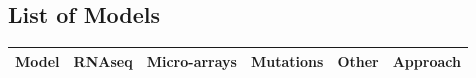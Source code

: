 \newpage

\begin{appendices}
    \section{List of Models} \label{ap:tables_models}
 
    \begin{small}
          \begin{longtable}[!h]{|p{2.0cm}|c|p{1.5cm}|c|p{2.2cm}|p{6.0cm}|} 
              \hline \multicolumn{1}{|c|}{\textbf{Model}} 
              & \multicolumn{1}{p{1.8cm}|}{\textbf{RNAseq}} 
              & \multicolumn{1}{p{1.5cm}|}{\textbf{Micro-arrays}} 
              & \multicolumn{1}{c|}{\textbf{Mutations}} 
              & \multicolumn{1}{c|}{\textbf{Other}}
              & \multicolumn{1}{c|}{\textbf{Approach}}  \\ \hline  \hline
              \endfirsthead
              

\end{longtable}
\end{small}
\end{appendices}
